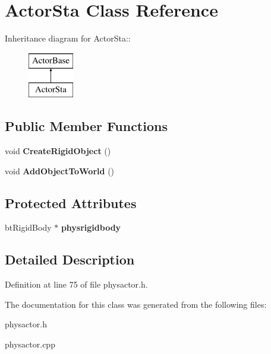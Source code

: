\hypertarget{classActorSta}{
\section{ActorSta Class Reference}
\label{d3/daf/classActorSta}
}
Inheritance diagram for ActorSta::\begin{figure}[H]
\begin{center}
\leavevmode
\includegraphics[height=2cm]{d3/daf/classActorSta}
\end{center}
\end{figure}
\subsection*{Public Member Functions}
\begin{DoxyCompactItemize}
\item 
\hypertarget{classActorSta_ae856b69de748541606649d21d2e6c270}{
void {\bfseries CreateRigidObject} ()}
\label{d3/daf/classActorSta_ae856b69de748541606649d21d2e6c270}

\item 
\hypertarget{classActorSta_a01a01730ee59fc271095e41674e9cea7}{
void {\bfseries AddObjectToWorld} ()}
\label{d3/daf/classActorSta_a01a01730ee59fc271095e41674e9cea7}

\end{DoxyCompactItemize}
\subsection*{Protected Attributes}
\begin{DoxyCompactItemize}
\item 
\hypertarget{classActorSta_ad12363fc4cd60d6cdd5e3c6d36d96f20}{
btRigidBody $\ast$ {\bfseries physrigidbody}}
\label{d3/daf/classActorSta_ad12363fc4cd60d6cdd5e3c6d36d96f20}

\end{DoxyCompactItemize}


\subsection{Detailed Description}


Definition at line 75 of file physactor.h.

The documentation for this class was generated from the following files:\begin{DoxyCompactItemize}
\item 
physactor.h\item 
physactor.cpp\end{DoxyCompactItemize}
